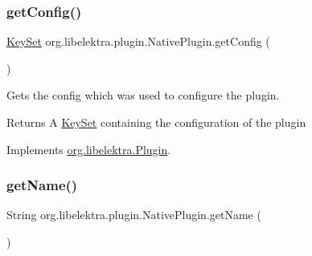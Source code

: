 \mbox{\label{classorg_1_1libelektra_1_1plugin_1_1NativePlugin_af9c78565029ed2ae38241759549e4b5a}} 
\subsubsection{\texorpdfstring{get\+Config()}{getConfig()}}
{\footnotesize\ttfamily \hyperlink{classorg_1_1libelektra_1_1KeySet}{Key\+Set} org.\+libelektra.\+plugin.\+Native\+Plugin.\+get\+Config (\begin{DoxyParamCaption}{ }\end{DoxyParamCaption})\hspace{0.3cm}{\ttfamily [inline]}}



Gets the config which was used to configure the plugin. 

\begin{DoxyReturn}{Returns}
A \hyperlink{classorg_1_1libelektra_1_1KeySet}{Key\+Set} containing the configuration of the plugin 
\end{DoxyReturn}


Implements \hyperlink{interfaceorg_1_1libelektra_1_1Plugin_a95ee37a782d5bd32fd95478788652d44}{org.\+libelektra.\+Plugin}.

\mbox{\label{classorg_1_1libelektra_1_1plugin_1_1NativePlugin_a606fc8f54bc810d874176103859976ab}} 
\subsubsection{\texorpdfstring{get\+Name()}{getName()}}
{\footnotesize\ttfamily String org.\+libelektra.\+plugin.\+Native\+Plugin.\+get\+Name (\begin{DoxyParamCaption}{ }\end{DoxyParamCaption})\hspace{0.3cm}{\ttfamily [inline]}}



